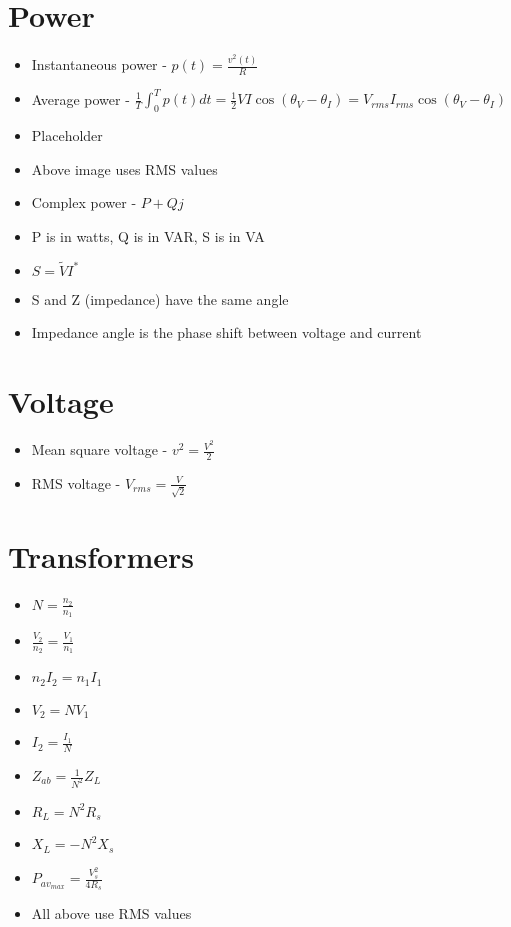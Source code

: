 \documentclass [12pt] {article}
\begin{document}
\begin{multicols*}{2}
\section{Power}
	\begin{itemize}
		\item Instantaneous power - $p(t) = \frac{v^2(t)}{R}$
		\item Average power - $\frac{1}{T} \int_0^T p(t) dt = \frac{1}{2}VI\cos(\theta_V - \theta_I) = V_{rms}I_{rms}\cos(\theta_V - \theta_I)$
		\item Placeholder %
		\item Above image uses RMS values
		\item Complex power - $P + Qj$
		\item P is in watts, Q is in VAR, S is in VA
		\item $S = \tilde{V}I^*$
		\item S and Z (impedance) have the same angle
		\item Impedance angle is the phase shift between voltage and current
	\end{itemize}
\section{Voltage}
	\begin{itemize}
		\item Mean square voltage - $v^2 = \frac{V^2}{2}$
		\item RMS voltage - $V_{rms} = \frac{V}{\sqrt{2}}$
	\end{itemize}
\section{Transformers}
	\begin{itemize}
		\item $N = \frac{n_2}{n_1}$
		\item $\frac{V_2}{n_2} = \frac{V_1}{n_1}$
		\item $n_2I_2 = n_1I_1$
		\item $V_2 = NV_1$
		\item $I_2 = \frac{I_1}{N}$
		\item $Z_{ab} = \frac{1}{N^2}Z_L$
		\item $R_L = N^2R_s$ 
		\item $X_L = -N^2X_s$
		\item $P_{av_{max}} = \frac{V_s^2}{4R_s}$
		\item All above use RMS values
	\end{itemize}

\end{multicols*}
\end{document}
